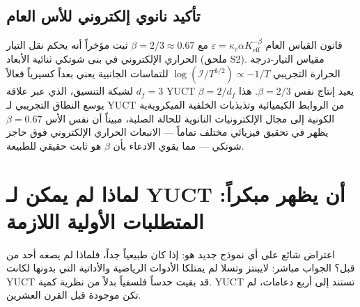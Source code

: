 \documentclass[12pt,a4paper]{article}
\begin{document}
	\subsection{تأكيد نانوي إلكتروني للأس العام}
	
	قانون القياس العام \(\varepsilon = \kappa_c \alpha K_{\mathrm{eff}}^{-\beta}\) مع \(\beta = 2/3 \approx 0.67\) ثبت مؤخراً أنه يحكم نقل التيار الحراري الإلكتروني في بنى شوتكي ثنائية الأبعاد (ملحق S2). مقياس التيار-درجة الحرارة التجريبي \(\log(\mathcal{I}/T^{3/2}) \propto -1/T\) للتماسات الجانبية يعني بعداً كسيرياً فعالاً \(d_f = 3\) لشبكة التنسيق، الذي عبر علاقة YUCT \(\beta = 2/d_f\) يعيد إنتاج نفس \(\beta = 2/3\). هذا يوسع النطاق التجريبي لـ YUCT من الروابط الكيميائية وتذبذبات الخلفية الميكرويةية الكونية إلى مجال الإلكترونيات النانوية للحالة الصلبة، مبيناً أن نفس الأس \(\beta = 0.67\) يظهر في تحقيق فيزيائي مختلف تماماً — الانبعاث الحراري الإلكتروني فوق حاجز شوتكي — مما يقوي الادعاء بأن \(\beta\) هو ثابت حقيقي للطبيعة.
	
	\section{لماذا لم يمكن لـ YUCT أن يظهر مبكراً: المتطلبات الأولية اللازمة}
	\label{sec:prerequisites}
	
	اعتراض شائع على أي نموذج جديد هو: إذا كان طبيعياً جداً، فلماذا لم يصغه أحد من قبل؟ الجواب مباشر: لايبنتز وتسلا لم يمتلكا الأدوات الرياضية والأداتية التي بدونها لكانت YUCT قد بقيت حدساً فلسفياً بدلاً من نظرية كمية. YUCT تستند إلى أربع دعامات، لم تكن موجودة قبل القرن العشرين.
	
\end{document}
